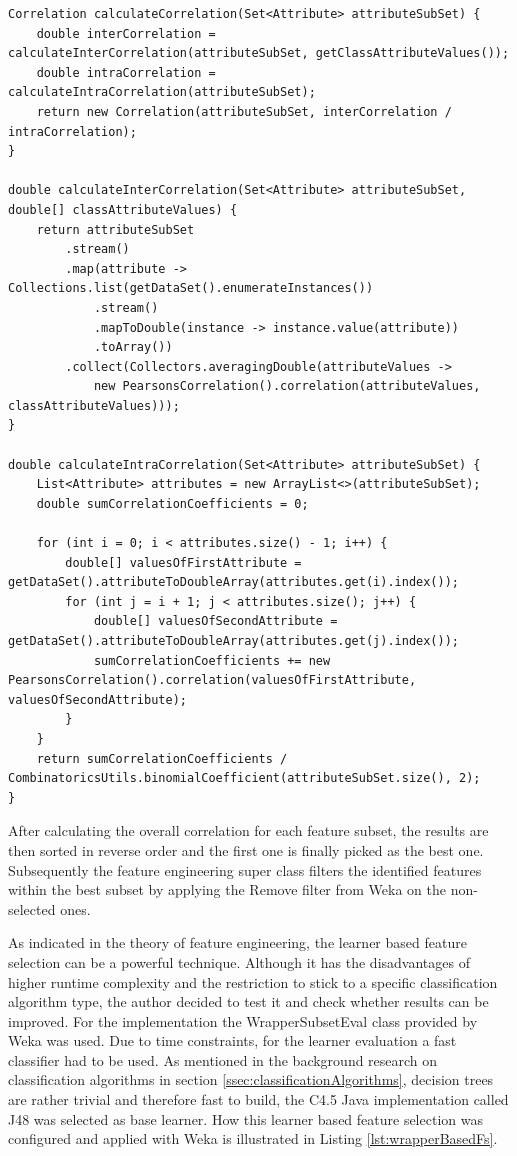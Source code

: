 \begin{lstlisting}[caption={Calculation of inter and intra correlation}, label={lst:attributeSelectionStrategy}]
Correlation calculateCorrelation(Set<Attribute> attributeSubSet) {
	double interCorrelation = calculateInterCorrelation(attributeSubSet, getClassAttributeValues());
	double intraCorrelation = calculateIntraCorrelation(attributeSubSet);
	return new Correlation(attributeSubSet, interCorrelation / intraCorrelation);
}

double calculateInterCorrelation(Set<Attribute> attributeSubSet, double[] classAttributeValues) {
	return attributeSubSet
		.stream()
		.map(attribute -> Collections.list(getDataSet().enumerateInstances())
			.stream()
			.mapToDouble(instance -> instance.value(attribute))
			.toArray())
		.collect(Collectors.averagingDouble(attributeValues ->
			new PearsonsCorrelation().correlation(attributeValues, classAttributeValues)));
}

double calculateIntraCorrelation(Set<Attribute> attributeSubSet) {
	List<Attribute> attributes = new ArrayList<>(attributeSubSet);
	double sumCorrelationCoefficients = 0;
	
	for (int i = 0; i < attributes.size() - 1; i++) {
		double[] valuesOfFirstAttribute = getDataSet().attributeToDoubleArray(attributes.get(i).index());
		for (int j = i + 1; j < attributes.size(); j++) {
			double[] valuesOfSecondAttribute = getDataSet().attributeToDoubleArray(attributes.get(j).index());
			sumCorrelationCoefficients += new PearsonsCorrelation().correlation(valuesOfFirstAttribute, valuesOfSecondAttribute);
		}
	}
	return sumCorrelationCoefficients / CombinatoricsUtils.binomialCoefficient(attributeSubSet.size(), 2);
}
\end{lstlisting}

After calculating the overall correlation for each feature subset, the results are then sorted in reverse order and the first one is finally picked as the best one. Subsequently the feature engineering super class filters the identified features within the best subset by applying the Remove filter from Weka on the non-selected ones. 

As indicated in the theory of feature engineering, the learner based feature selection can be a powerful technique. Although it has the disadvantages of higher runtime complexity and the restriction to stick to a specific classification algorithm type, the author decided to test it and check whether results can be improved. For the implementation the WrapperSubsetEval class provided by Weka was used. Due to time constraints, for the learner evaluation a fast classifier had to be used. As mentioned in the background research on classification algorithms in section \ref{ssec:classificationAlgorithms}, decision trees are rather trivial and therefore fast to build, the C4.5 Java implementation called J48 was selected as base learner. How this learner based feature selection was configured and applied with Weka is illustrated in Listing \ref{lst:wrapperBasedFs}. 


